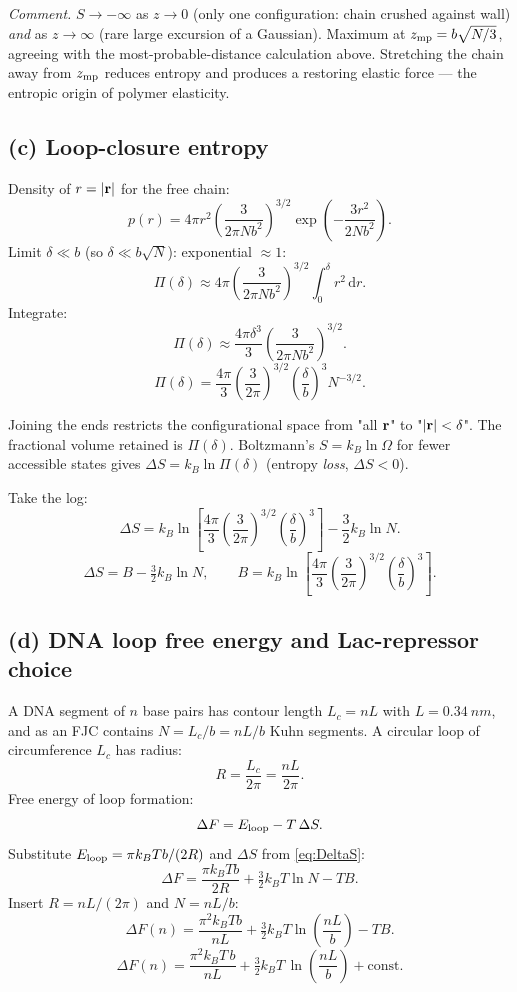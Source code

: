 \documentclass[11pt]{article}
\newcommand{\de}{\mathrm{d}}
\begin{document}
\textit{Comment.} $S\to-\infty$ as $z\to 0$ (only one configuration: chain crushed against wall) \emph{and} as $z\to\infty$ (rare large excursion of a Gaussian). Maximum at $z_{\rm mp}=b\sqrt{N/3}$, agreeing with the most-probable-distance calculation above. Stretching the chain away from $z_{\rm mp}$ reduces entropy and produces a restoring elastic force --- the entropic origin of polymer elasticity.

\subsection*{(c) Loop-closure entropy}

Density of $r=|\vb r|$ for the free chain:
\[ p(r)=4\pi r^2\!\left(\frac{3}{2\pi N b^2}\right)^{3/2}\exp\!\left(-\frac{3r^2}{2Nb^2}\right). \]
Limit $\delta\ll b$ (so $\delta\ll b\sqrt{N}$): exponential $\approx 1$:
\[ \Pi(\delta) \approx 4\pi\!\left(\frac{3}{2\pi N b^2}\right)^{3/2}\!\int_0^\delta r^2\,\de r. \]
Integrate:
\[ \Pi(\delta) \approx \frac{4\pi\delta^3}{3}\!\left(\frac{3}{2\pi Nb^2}\right)^{3/2}. \]
\begin{equation}
\boxed{\;\Pi(\delta) = \frac{4\pi}{3}\!\left(\frac{3}{2\pi}\right)^{3/2}\!\left(\frac{\delta}{b}\right)^{3}N^{-3/2}.\;}
\label{eq:Pi}
\end{equation}

Joining the ends restricts the configurational space from "all $\vb r$" to "$|\vb r|<\delta$". The fractional volume retained is $\Pi(\delta)$. Boltzmann's $S=k_B\ln\Omega$ for fewer accessible states gives $\Delta S = k_B\ln\Pi(\delta)$ (entropy \emph{loss}, $\Delta S<0$).

Take the log:
\[ \Delta S = k_B\ln\!\left[\frac{4\pi}{3}\!\left(\frac{3}{2\pi}\right)^{3/2}\!\left(\frac{\delta}{b}\right)^{3}\right] - \frac{3}{2}k_B\ln N. \]
\begin{equation}
\boxed{\;\Delta S = B - \tfrac{3}{2}k_B\ln N,\qquad B = k_B\ln\!\left[\frac{4\pi}{3}\!\left(\frac{3}{2\pi}\right)^{3/2}\!\left(\frac{\delta}{b}\right)^{3}\right].\;}
\label{eq:DeltaS}
\end{equation}

\subsection*{(d) DNA loop free energy and Lac-repressor choice}

A DNA segment of $n$ base pairs has contour length $L_c = nL$ with $L=\SI{0.34}{nm}$, and as an FJC contains $N=L_c/b = nL/b$ Kuhn segments. A circular loop of circumference $L_c$ has radius:
\[ R = \frac{L_c}{2\pi} = \frac{nL}{2\pi}. \]
Free energy of loop formation:
\[ \Delta F = E_{\rm loop} - T\,\Delta S. \]
Substitute $E_{\rm loop} = \pi k_B T b/(2R)$ and $\Delta S$ from \eqref{eq:DeltaS}:
\[ \Delta F = \frac{\pi k_B T b}{2R} + \tfrac{3}{2}k_B T\ln N - TB. \]
Insert $R=nL/(2\pi)$ and $N=nL/b$:
\[ \Delta F(n) = \frac{\pi^2 k_B T b}{nL} + \tfrac{3}{2}k_B T\ln\!\left(\frac{nL}{b}\right) - TB. \]
\begin{equation}
\boxed{\;\Delta F(n) = \frac{\pi^2 k_B T\,b}{nL} + \tfrac{3}{2}k_B T\,\ln\!\left(\frac{nL}{b}\right) + \text{const}.\;}
\label{eq:DFloop}
\end{equation}
\end{document}
